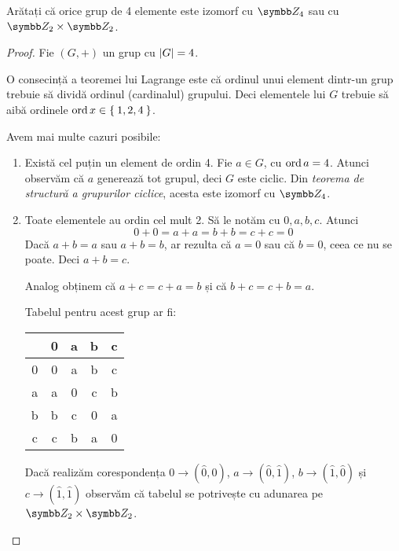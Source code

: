 \begin{exercise}
Arătați că orice grup de 4 elemente este izomorf cu \(\integersmod{4}\) sau cu \(\integersmod{2} \times \integersmod{2}\). 
\end{exercise}
\begin{proof}
Fie \((G, +)\) un grup cu \(\left\lvert G \right\rvert = 4\).

O consecință a teoremei lui Lagrange este că ordinul unui element dintr-un grup trebuie să dividă ordinul (cardinalul) grupului. Deci elementele lui \(G\) trebuie să aibă ordinele \(\operatorname{ord} x \in \Set{1, 2, 4}\).

Avem mai multe cazuri posibile:
\begin{enumerate}
    \item Există cel puțin un element de ordin 4. Fie \(a \in G\), cu \(\operatorname{ord} a = 4\). Atunci observăm că \(a\) generează tot grupul, deci \(G\) este ciclic. Din \emph{teorema de structură a grupurilor ciclice}, acesta este izomorf cu \(\integersmod{4}\).
    
    \item Toate elementele au ordin cel mult 2. Să le notăm cu \(0, a, b, c\). Atunci
    \[
        0 + 0 = a + a = b + b = c + c = 0
    \]
    Dacă \(a + b = a\) sau \(a + b = b\), ar rezulta că \(a = 0\) sau că \(b = 0\), ceea ce nu se poate. Deci \(a + b = c\).
    
    Analog obținem că \(a + c = c + a = b\) și că \(b + c = c + b = a\).
    
    Tabelul pentru acest grup ar fi:
    \begin{center}
        \begin{tabular}{C|C|C|C|C} 
          & 0 & a & b & c \\
         & 0 & a & b & c \\
        \hline
        a & a & 0 & c & b \\
        \hline
        b & b & c & 0 & a \\
        \hline
        c & c & b & a & 0 \\
        \end{tabular}
    \end{center}
    
    Dacă realizăm corespondența \(0 \to (\widehat{0}, \widehat{0})\), \(a \to (\widehat{0}, \widehat{1})\), \(b \to (\widehat{1}, \widehat{0})\) și \(c \to (\widehat{1}, \widehat{1})\) observăm că tabelul se potrivește cu adunarea pe \(\integersmod{2} \times \integersmod{2}\).
\end{enumerate}

\end{proof}

